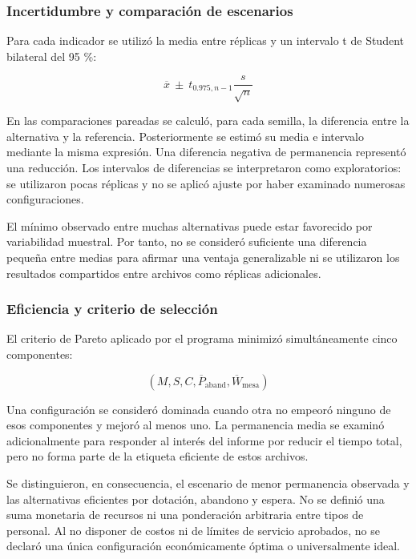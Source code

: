 \documentclass[10pt,a4paper,twocolumn]{article}
\begin{document}
\subsubsection*{Incertidumbre y comparación de escenarios}

Para cada indicador se utilizó la media entre réplicas y un intervalo t de Student bilateral del 95 \%:

\begin{equation}
\overline x\ \pm\ t_{0.975,n-1}\frac{s}{\sqrt n}
\end{equation}

En las comparaciones pareadas se calculó, para cada semilla, la diferencia entre la alternativa y la referencia. Posteriormente se estimó su media e intervalo mediante la misma expresión. Una diferencia negativa de permanencia representó una reducción. Los intervalos de diferencias se interpretaron como exploratorios: se utilizaron pocas réplicas y no se aplicó ajuste por haber examinado numerosas configuraciones.

El mínimo observado entre muchas alternativas puede estar favorecido por variabilidad muestral. Por tanto, no se consideró suficiente una diferencia pequeña entre medias para afirmar una ventaja generalizable ni se utilizaron los resultados compartidos entre archivos como réplicas adicionales.

\subsubsection*{Eficiencia y criterio de selección}

El criterio de Pareto aplicado por el programa minimizó simultáneamente cinco componentes:

\begin{equation}
\left(M,S,C,\overline P_{\mathrm{aband}},\overline W_{\mathrm{mesa}}\right)
\end{equation}

Una configuración se consideró dominada cuando otra no empeoró ninguno de esos componentes y mejoró al menos uno. La permanencia media se examinó adicionalmente para responder al interés del informe por reducir el tiempo total, pero no forma parte de la etiqueta eficiente de estos archivos.

Se distinguieron, en consecuencia, el escenario de menor permanencia observada y las alternativas eficientes por dotación, abandono y espera. No se definió una suma monetaria de recursos ni una ponderación arbitraria entre tipos de personal. Al no disponer de costos ni de límites de servicio aprobados, no se declaró una única configuración económicamente óptima o universalmente ideal.
\end{document}
